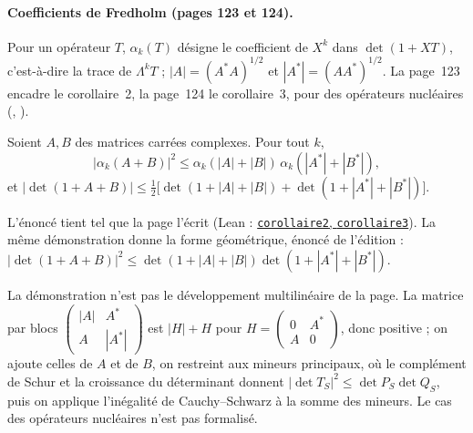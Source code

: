 \paragraph{Coefficients de Fredholm (pages 123 et 124).} Pour un opérateur $T$, $\alpha_k(T)$ désigne le coefficient de $X^k$ dans $\det(1 + XT)$, c'est-à-dire la trace de $\Lambda^k T$ ; $|A| = (A^*A)^{1/2}$ et $|A^*| = (AA^*)^{1/2}$. La page~123 encadre le corollaire~2, la page~124 le corollaire~3, pour des opérateurs nucléaires (, ).

\begin{encadre}
\begin{theoreme}
Soient $A, B$ des matrices carrées complexes. Pour tout $k$,
\[ |\alpha_k(A + B)|^2 \leq \alpha_k(|A| + |B|)\, \alpha_k(|A^*| + |B^*|), \]
et $|\det(1 + A + B)| \leq \frac12 \big[\det(1 + |A| + |B|) + \det(1 + |A^*| + |B^*|)\big]$.
\end{theoreme}
\end{encadre}
L'énoncé tient tel que la page l'écrit (Lean : \href{\leanblob/LinearAlgebra/Folder1.lean}{\texttt{corollaire2}, \texttt{corollaire3}}). La même démonstration donne la forme géométrique, énoncé de l'édition : $|\det(1 + A + B)|^2 \leq \det(1 + |A| + |B|) \det(1 + |A^*| + |B^*|)$.

\begin{remarque}
La démonstration n'est pas le développement multilinéaire de la page. La matrice par blocs $\left(\begin{smallmatrix} |A| & A^* \\ A & |A^*| \end{smallmatrix}\right)$ est $|H| + H$ pour $H = \left(\begin{smallmatrix} 0 & A^* \\ A & 0 \end{smallmatrix}\right)$, donc positive ; on ajoute celles de $A$ et de $B$, on restreint aux mineurs principaux, où le complément de Schur et la croissance du déterminant donnent $|\det T_S|^2 \leq \det P_S \det Q_S$, puis on applique l'inégalité de Cauchy--Schwarz à la somme des mineurs. Le cas des opérateurs nucléaires n'est pas formalisé.
\end{remarque}


